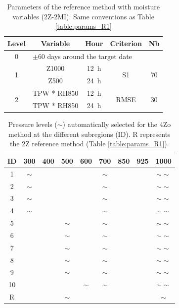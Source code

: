 \documentclass[review]{elsarticle}
\begin{document}
\begin{table}[t]
	\caption{Parameters of the reference method with moisture variables (2Z-2MI). Same conventions as Table \ref{table:params_R1}}
	\footnotesize
	\begin{center}
		\begin{tabular}{ccccc}
			\hline 
			Level & Variable & Hour & Criterion & Nb \\ 
			\hline 
			0 & \multicolumn{4}{l}{$\pm 60$ days around the target date} \\
			\hline 
			\multirow{2}{*}{1} & Z1000 & 12~h & \multirow{2}{*}{S1} & \multirow{2}{*}{70} \\
			& Z500 & 24~h & & \\ 
			\hline
			\multirow{2}{*}{2} & TPW * RH850 & 12~h & \multirow{2}{*}{RMSE} & \multirow{2}{*}{30} \\
			& TPW * RH850 & 24~h & & \\ 
			\hline 
		\end{tabular} 
	\end{center}
	\label{table:params_R2}
\end{table}

\begin{table}[t]
	\caption{Pressure levels ($\sim$) automatically selected for the 4Zo method at the different subregions (ID). R represents the 2Z reference method (Table \ref{table:params_R1}).}
	\footnotesize
	\begin{center}
		\begin{tabular}{ccccccccc}
			\hline ID & 300 & 400 & 500 & 600 & 700 & 850 & 925 & 1000 \\ 
			\hline 
			1  & $\sim$ &   &   &   & $\sim$ &   &   & $\sim \sim$ \\
			2  & $\sim$ &   &   &   & $\sim$ &   &   & $\sim \sim$ \\
			3  & $\sim$ &   &   &   & $\sim$ &   &   & $\sim \sim$ \\
			4  & $\sim$ &   &   &   & $\sim$ &   &   & $\sim \sim$ \\
			5  &   &   & $\sim$ &   & $\sim$ &   &   & $\sim \sim$ \\
			6  &   &   & $\sim$ &   & $\sim$ &   &   & $\sim \sim$ \\
			7  &   &   & $\sim$ &   & $\sim$ &   &   & $\sim \sim$ \\
			8  &   &   & $\sim$ &   & $\sim$ &   &   & $\sim \sim$ \\
			9  &   &   & $\sim$ &   & $\sim$ &   &   & $\sim \sim$ \\
			10 &   &   &   & $\sim$ & $\sim$ &   &   & $\sim \sim$ \\
			\hline 	
			R  &   &   & $\sim$ &   &   &   &   & $\sim$ \\
			\hline 
		\end{tabular} 
	\end{center}
	\label{table:levels_GA_4Zo}
\end{table}
\end{document}
